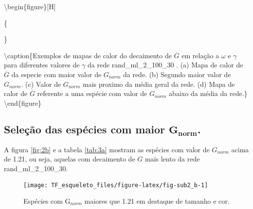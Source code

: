 \documentclass[
  12pt,
]{article}
\begin{document}
\textbackslash begin\{figure\}{[}H{]}

\{\centering {}\newline{}

\}

\textbackslash caption\{\label{fig:1b.2}Exemplos de mapas de calor do
decaimento de \(\overline{G}\) em relação a \(\omega\) e \(\gamma\) para
diferentes valores de \(\gamma\) da rede rand\_ml\_2\_100\_30 . (a) Mapa
de calor de \(\overline{G}\) da especie com maior valor de \(G_{norm}\)
da rede. (b) Segundo maior valor de \(G_{norm}\). (c) Valor de
\(G_{norm}\) mais proximo da média geral da rede. (d) Mapa de calor de
\(\overline{G}\) referente a uma espécie com valor de \(G_{norm}\)
abaixo da média da rede.\}\label{fig:decaimentos_ilustrativos_heatmap_b}
\textbackslash end\{figure\}

\hypertarget{seleuxe7uxe3o-das-espuxe9cies-com-maior-mathbfg_norm.-1}{%
\subsection{\texorpdfstring{Seleção das espécies com maior
\(\mathbf{G_{norm}}\).}{Seleção das espécies com maior \textbackslash mathbf\{G\_\{norm\}\}.}}\label{seleuxe7uxe3o-das-espuxe9cies-com-maior-mathbfg_norm.-1}}

A figura \ref{fig:2b} e a tabela \ref{tab:3a} mostram as espécies com
valor de \(G_{norm}\) acima de 1.21, ou seja, aquelas com decaimento de
\(G\) mais lento da rede rand\_ml\_2\_100\_30.

\begin{figure}[H]

{\centering \texttt{[image: TF\_esqueleto\_files/figure-latex/fig-sub2\_b-1]} 

}

\caption{\label{fig:2b}Espécies com G$_{norm}$ maiores que  1.21 em destaque de tamanho e cor.}\label{fig:fig-sub2_b}
\end{figure}
\end{document}
